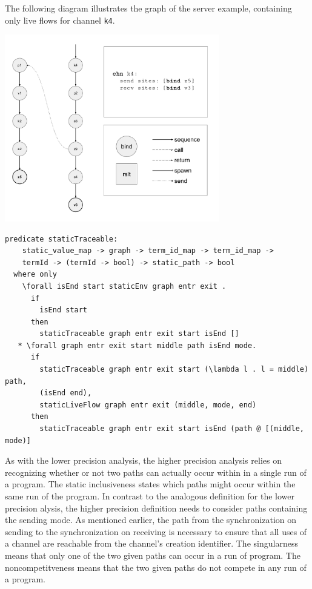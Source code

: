 \documentclass[letterpaper, 11pt]{extarticle}
\begin{document}
The following diagram illustrates the graph of the server example,
containing only live flows for channel \lstinline{k4}. \

\includegraphics[width=0.7\textwidth]{cml-graph-k4.pdf}

\begin{lstlisting}[language=logic, mathescape]
  predicate staticTraceable:
    static_value_map -> graph -> term_id_map -> term_id_map ->
    termId -> (termId -> bool) -> static_path -> bool
  where only
    \forall isEnd start staticEnv graph entr exit .
      if
        isEnd start
      then
        staticTraceable graph entr exit start isEnd []
   * \forall graph entr exit start middle path isEnd mode. 
      if
        staticTraceable graph entr exit start (\lambda l . l = middle) path, 
        (isEnd end),
        staticLiveFlow graph entr exit (middle, mode, end) 
      then
        staticTraceable graph entr exit start isEnd (path @ [(middle, mode)]
\end{lstlisting}

As with the lower precision analysis, the higher precision analysis relies on recognizing
whether or not two paths can actually occur within in a single run of a program. The static
inclusiveness states which paths might occur within the same run of the program.
In contrast to the analogous definition for the lower precision
alysis, the higher precision definition needs to consider paths containing the
sending mode.  As mentioned earlier, the path from the synchronization on sending to the
synchronization on receiving is necessary to ensure that all uses of a channel are reachable
from the channel's creation identifier.  The singularness means that only one of the two
given paths can occur in a run of program.  The noncompetitveness means that the two
given paths do not compete in any run of a program. 
\end{document}
